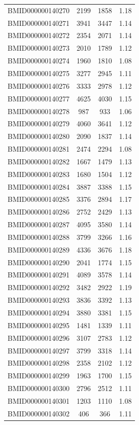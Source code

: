 \documentclass{bmcart}
\begin{document}
\begin{backmatter}
\begin{center}
\begin{longtable}{c|c|c|c}
BMID000000140270 & 2199 & 1858 & 1.18 \\
BMID000000140271 & 3941 & 3447 & 1.14 \\
BMID000000140272 & 2354 & 2071 & 1.14 \\
BMID000000140273 & 2010 & 1789 & 1.12 \\
BMID000000140274 & 1960 & 1810 & 1.08 \\
BMID000000140275 & 3277 & 2945 & 1.11 \\
BMID000000140276 & 3333 & 2978 & 1.12 \\
BMID000000140277 & 4625 & 4030 & 1.15 \\
BMID000000140278 & 987 & 933 & 1.06 \\
BMID000000140279 & 4060 & 3641 & 1.12 \\
BMID000000140280 & 2090 & 1837 & 1.14 \\
BMID000000140281 & 2474 & 2294 & 1.08 \\
BMID000000140282 & 1667 & 1479 & 1.13 \\
BMID000000140283 & 1680 & 1504 & 1.12 \\
BMID000000140284 & 3887 & 3388 & 1.15 \\
BMID000000140285 & 3376 & 2894 & 1.17 \\
BMID000000140286 & 2752 & 2429 & 1.13 \\
BMID000000140287 & 4095 & 3580 & 1.14 \\
BMID000000140288 & 3799 & 3266 & 1.16 \\
BMID000000140289 & 4336 & 3676 & 1.18 \\
BMID000000140290 & 2041 & 1774 & 1.15 \\
BMID000000140291 & 4089 & 3578 & 1.14 \\
BMID000000140292 & 3482 & 2922 & 1.19 \\
BMID000000140293 & 3836 & 3392 & 1.13 \\
BMID000000140294 & 3880 & 3381 & 1.15 \\
BMID000000140295 & 1481 & 1339 & 1.11 \\
BMID000000140296 & 3107 & 2783 & 1.12 \\
BMID000000140297 & 3799 & 3318 & 1.14 \\
BMID000000140298 & 2358 & 2102 & 1.12 \\
BMID000000140299 & 1963 & 1700 & 1.15 \\
BMID000000140300 & 2796 & 2512 & 1.11 \\
BMID000000140301 & 1203 & 1110 & 1.08 \\
BMID000000140302 & 406 & 366 & 1.11 \\

\end{longtable}
\end{center}
\end{backmatter}
\end{document}
